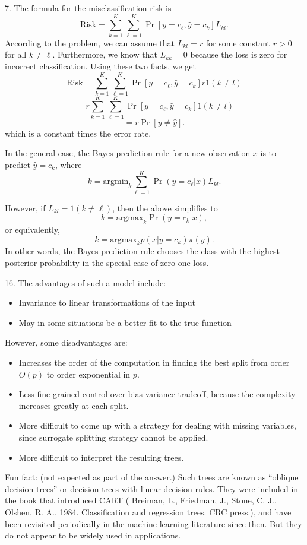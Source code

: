 \documentclass[12pt]{article}
\begin{document}
7. The formula for the misclassification risk is
\[
\text{Risk} = \sum_{k = 1}^K \sum_{\ell = 1}^K \Pr[y = c_\ell, \hat{y} = c_k] L_{kl}.
\]
According to the problem, we can assume that $L_{kl} = r$ for some constant $r > 0$ for all $k \neq \ell$. Furthermore, we know that $L_{kk} = 0$ because the loss is zero for incorrect classification.  Using these two facts, we get
\[
\text{Risk} = \sum_{k = 1}^K \sum_{\ell = 1}^K \Pr[y = c_\ell, \hat{y} = c_k] r 1(k \neq l)
\]
\[
 = r \sum_{k = 1}^K \sum_{\ell = 1}^K \Pr[y = c_\ell, \hat{y} = c_k] 1(k \neq l)
\]
\[
 = r \Pr[y \neq \hat{y}].
\]
which is a constant times the error rate.

In the general case, the Bayes prediction rule for a new observation $x$ is to predict $\hat{y} = c_k$, where
\[
k = \text{argmin}_k \sum_{\ell=1}^{K} \Pr(y=c_\ell|x) L_{kl}.
\]

However, if $L_{kl} = 1(k \neq \ell)$, then the above simplifies to
\[
k = \text{argmax}_k \Pr(y = c_k|x),
\]
or equivalently,
\[
k = \text{argmax}_k p(x|y=c_k) \pi(y).
\]
In other words, the Bayes prediction rule chooses the class with the highest posterior probability in the special case of zero-one loss.

16. The advantages of such a model include:
\begin{itemize}
\item Invariance to linear transformations of the input
\item May in some situations be a better fit to the true function
\end{itemize}
However, some disadvantages are:
\begin{itemize}
\item Increases the order of the computation in finding the best split from order $O(p)$ to order exponential in $p$.
\item Less fine-grained control over bias-variance tradeoff, because the complexity increases greatly at each split.
\item More difficult to come up with a strategy for dealing with missing variables, since surrogate splitting strategy cannot be applied.
\item More difficult to interpret the resulting trees.
\end{itemize}

Fun fact: (not expected as part of the answer.)  Such trees are known as ``oblique decision trees'' or decision trees with linear decision rules.  They were included in the book that introduced CART ( Breiman, L., Friedman, J., Stone, C. J., Olshen, R. A., 1984. Classification and regression trees. CRC press.), and have been revisited periodically in the machine learning literature since then.  But they do not appear to be widely used in applications.
\end{document}
